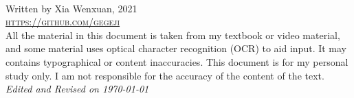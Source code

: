 \documentclass[11pt,fleqn, twoside, openany]{book} %
\begin{document}
\SetEndCharOfAlgoLine{}





\newpage
~\vfill
\thispagestyle{empty}

\noindent Written by Xia Wenxuan, 2021\\


\noindent \textsc{\url{https://github.com/gegeji}}\\ %


\noindent All the material in this document is taken from my textbook or video material, and some material uses optical character recognition (OCR) to aid input. It may contains typographical or content inaccuracies. This document is for my personal study only. I am not responsible for the accuracy of the content of the text.\\

\noindent \textit{Edited and Revised on \today} %
\end{document}
